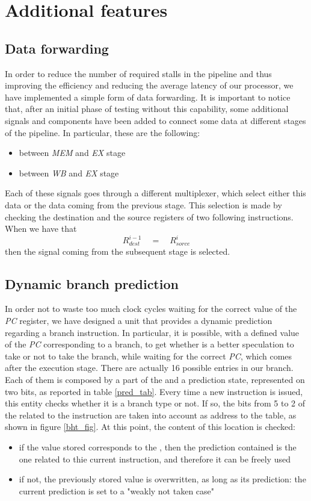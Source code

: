 \chapter{Additional features}
\label{chap_add_feat}
\section{Data forwarding}
In order to reduce the number of required stalls in the pipeline and thus improving the efficiency and reducing the average latency of our processor, we have implemented a simple form of data forwarding.
It is important to notice that, after an initial phase of testing without this capability, some additional signals and components have been added to connect some data at different stages of the pipeline. In particular, these are the following:
\begin{itemize}
	\item between \textit{MEM} and \textit{EX} stage
	\item between \textit{WB} and \textit{EX} stage
\end{itemize}

Each of these signals goes through a different multiplexer, which select either this data or the data coming from the previous stage. This selection is made by checking the destination and the source registers of two following instructions. When we have that
\[R^{i-1}_{dest}\quad = \quad R^{i}_{sorce}\]
then the signal coming from the subsequent stage is selected.


\section{Dynamic branch prediction}
\label{dyn_br}
In order not to waste too much clock cycles waiting for the correct value of the \textit{PC} register, we have designed a unit that provides a dynamic prediction regarding a branch instruction. In particular, it is possible, with a defined value of the \textit{PC} corresponding to a branch, to get whether is a better speculation to take or not to take the branch, while waiting for the correct \textit{PC}, which comes after the execution stage. 
There are actually 16 possible entries in our branch. Each of them is composed by a part of the \pc and a prediction state, represented on two bits, as reported in table \ref{pred_tab}. Every time a new instruction is issued, this entity checks whether it is a branch type or not. If so, the bits from 5 to 2 of the \pc related to the instruction are taken into account as address to the table, as shown in figure \ref{bht_fig}. At this point, the content of this location is checked:
\begin{itemize}
	\item if the value stored corresponds to the \pc, then the prediction contained is the one related to thie current instruction, and therefore it can be freely used
	\item if not, the previously stored value is overwritten, as long as its prediction: the current prediction is set to a "weakly not taken case"
\end{itemize}

